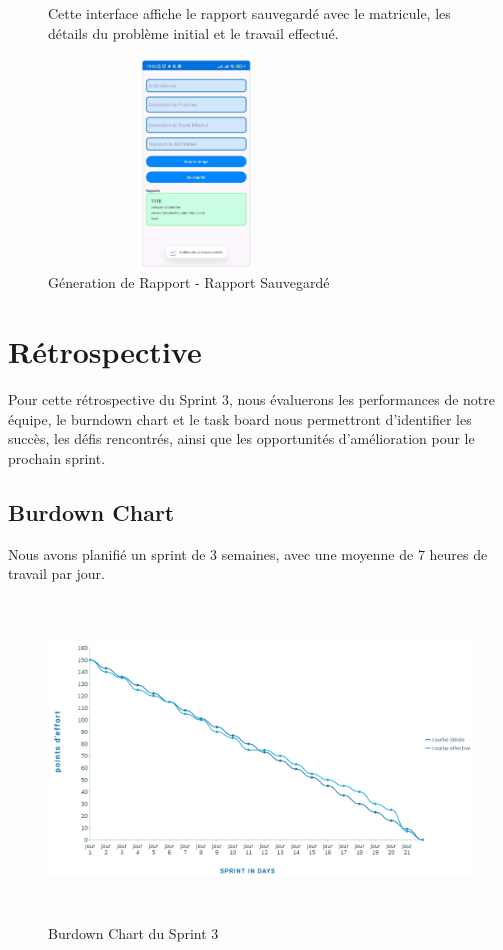 \begin{figure}[H]
    \centering
    \begin{minipage}{0.58\textwidth}
        \raggedright
        Cette interface affiche le rapport sauvegardé avec le matricule, les détails du problème initial et le travail effectué.
    \end{minipage}
    \hfill
    \begin{minipage}{0.39\textwidth}
        \centering
        \includegraphics[width=0.7\textwidth,height=5.6cm]{chap5.images/r33.png}
        \caption{\centering Géneration de Rapport - Rapport Sauvegardé }
    \end{minipage}
\end{figure}

\newpage
\section{Rétrospective}
Pour cette rétrospective du Sprint 3, nous évaluerons les performances de notre équipe, le burndown chart et le task board nous permettront d'identifier les succès, les défis rencontrés, ainsi que les opportunités d'amélioration pour le prochain sprint.
\subsection{Burdown Chart}
Nous avons planifié un sprint de 3 semaines, avec une moyenne de 7 heures de travail par jour.

\begin{figure}[h!]
    \centering
    \includegraphics[width=1\textwidth, height=8.5cm]{chap5.images/Burndown chart sprint 3.png}
    \caption{ Burdown Chart du Sprint 3}

\end{figure}


